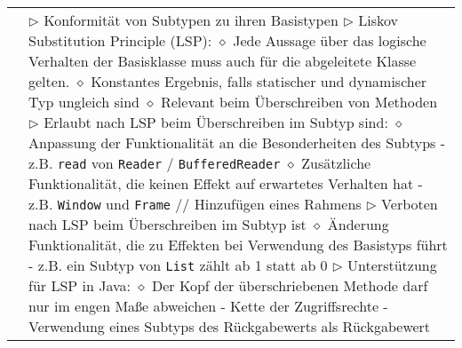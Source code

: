 \begin{longtable}{ | p{} p{} | }
	\makecell[l]{Konformität} & \makecell[l]{
	$\triangleright$  Konformität von Subtypen zu ihren Basistypen \\
	$\triangleright$ Liskov Substitution Principle (LSP): \\
	\hspace{0.4cm} $\diamond$ Jede Aussage über das logische Verhalten der Basisklasse muss \\
	\hspace{0.8cm} auch für die abgeleitete Klasse gelten. \\
	\hspace{0.4cm} $\diamond$ Konstantes Ergebnis, falls statischer und dynamischer Typ ungleich sind \\
	\hspace{0.4cm} $\diamond$ Relevant beim Überschreiben von Methoden \\
	$\triangleright$ Erlaubt nach LSP beim Überschreiben im Subtyp sind: \\
	\hspace{0.4cm} $\diamond$ Anpassung der Funktionalität an die Besonderheiten des Subtyps \\
	\hspace{0.6cm} - z.B. \texttt{read} von \texttt{Reader} / \texttt{BufferedReader} \\
	\hspace{0.4cm} $\diamond$ Zusätzliche Funktionalität, die keinen Effekt auf erwartetes Verhalten hat \\ 
	\hspace{0.6cm} - z.B. \texttt{Window} und \texttt{Frame} // Hinzufügen eines Rahmens \\
	$\triangleright$ Verboten nach LSP beim Überschreiben im Subtyp ist \\
	\hspace{0.4cm} $\diamond$ Änderung Funktionalität, die zu Effekten bei Verwendung des Basistyps führt \\
	\hspace{0.6cm} - z.B. ein Subtyp von \texttt{List} zählt ab 1 statt ab 0 \\
	$\triangleright$ Unterstützung für LSP in Java: \\
	\hspace{0.4cm} $\diamond$ Der Kopf der überschriebenen Methode darf nur im engen Ma\ss e abweichen \\
	\hspace{0.6cm} - Kette der Zugriffsrechte \\
	\hspace{0.6cm} - Verwendung eines Subtyps des Rückgabewerts als Rückgabewert \\
}
\end{longtable}
